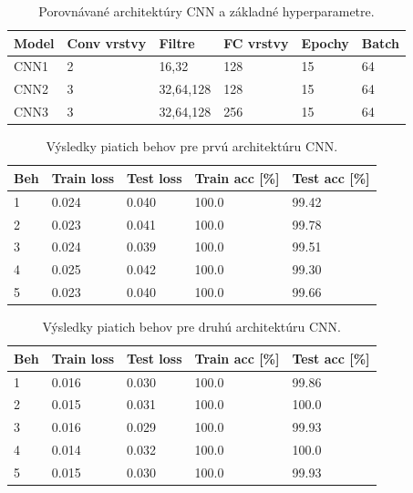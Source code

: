 \documentclass[12pt, a4paper]{article}
\begin{document}
\begin{table}[htbp]
\centering
\caption{Porovnávané architektúry CNN a základné hyperparametre.}
\label{tab:cnn_structures}
\begin{tabular}{llllll}
\toprule
Model & Conv vrstvy & Filtre & FC vrstvy & Epochy & Batch \\
\midrule
CNN1 & 2 & 16,32 & 128 & 15 & 64 \\
CNN2 & 3 & 32,64,128 & 128 & 15 & 64 \\
CNN3 & 3 & 32,64,128 & 256 & 15 & 64 \\
\bottomrule
\end{tabular}
\end{table}

\begin{table}[htbp]
\centering
\caption{Výsledky piatich behov pre prvú architektúru CNN.}
\label{tab:cnn1_runs}
\begin{tabular}{lllll}
\toprule
Beh & Train loss & Test loss & Train acc [\%] & Test acc [\%] \\
\midrule
1 & 0.024 & 0.040 & 100.0 & 99.42 \\
2 & 0.023 & 0.041 & 100.0 & 99.78 \\
3 & 0.024 & 0.039 & 100.0 & 99.51 \\
4 & 0.025 & 0.042 & 100.0 & 99.30 \\
5 & 0.023 & 0.040 & 100.0 & 99.66 \\
\bottomrule
\end{tabular}
\end{table}

\begin{table}[ht]
\centering
\caption{Výsledky piatich behov pre druhú architektúru CNN.}
\label{tab:cnn2_runs}
\begin{tabular}{lllll}
\toprule
Beh & Train loss & Test loss & Train acc [\%] & Test acc [\%] \\
\midrule
1 & 0.016 & 0.030 & 100.0 & 99.86 \\
2 & 0.015 & 0.031 & 100.0 & 100.0 \\
3 & 0.016 & 0.029 & 100.0 & 99.93 \\
4 & 0.014 & 0.032 & 100.0 & 100.0 \\
5 & 0.015 & 0.030 & 100.0 & 99.93 \\
\bottomrule
\end{tabular}
\end{table}
\end{document}
